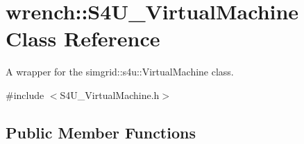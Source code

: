 \hypertarget{classwrench_1_1_s4_u___virtual_machine}{}\section{wrench\+:\+:S4\+U\+\_\+\+Virtual\+Machine Class Reference}
\label{classwrench_1_1_s4_u___virtual_machine}


A wrapper for the simgrid\+::s4u\+::\+Virtual\+Machine class.  




{\ttfamily \#include $<$S4\+U\+\_\+\+Virtual\+Machine.\+h$>$}

\subsection*{Public Member Functions}
